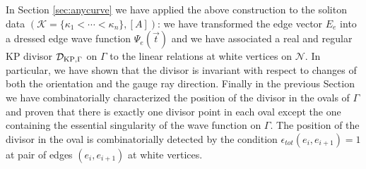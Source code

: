 \documentclass[11pt]{amsart}
\theoremstyle{plain}
\numberwithin{equation}{section}
\def \DKP {{\mathcal D}_{\textup{\scriptsize KP},\Gamma}}
\begin{document}
In Section \ref{sec:anycurve} we have applied the above construction to the soliton data $(\mathcal K = \{\kappa_1<\cdots <\kappa_n\}, [A])$: we have transformed the edge vector $E_e$ into a dressed edge wave function $\Psi_e(\vec t)$ and we have associated a real and regular KP divisor $\DKP$ on $\Gamma$ to the linear relations at white vertices on $\mathcal N$. In particular, we have shown that the divisor is invariant with respect to changes of both the orientation and the gauge ray direction. Finally in the previous Section we have combinatorially characterized the position of the divisor in the ovals of $\Gamma$ and proven that there is exactly one divisor point in each oval except the one containing the essential singularity of the wave function on $\Gamma$. The position of the divisor in the oval is combinatorially detected by the condition $\epsilon_{tot}(e_i,e_{i+1})=1$ at pair of edges $(e_i, e_{i+1})$ at white vertices.
\end{document}
